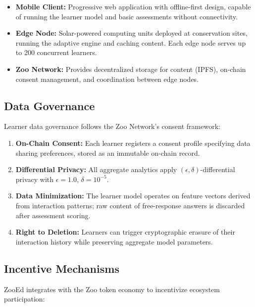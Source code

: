 \documentclass[11pt,a4paper]{article}
\begin{document}
\begin{itemize}[leftmargin=*]
    \item \textbf{Mobile Client:} Progressive web application with offline-first design, capable of running the learner model and basic assessments without connectivity.
    \item \textbf{Edge Node:} Solar-powered computing units deployed at conservation sites, running the adaptive engine and caching content. Each edge node serves up to 200 concurrent learners.
    \item \textbf{Zoo Network:} Provides decentralized storage for content (IPFS), on-chain consent management, and coordination between edge nodes.
\end{itemize}

\subsection{Data Governance}

Learner data governance follows the Zoo Network's consent framework:

\begin{enumerate}[leftmargin=*]
    \item \textbf{On-Chain Consent:} Each learner registers a consent profile specifying data sharing preferences, stored as an immutable on-chain record.
    \item \textbf{Differential Privacy:} All aggregate analytics apply $(\epsilon, \delta)$-differential privacy with $\epsilon = 1.0$, $\delta = 10^{-5}$.
    \item \textbf{Data Minimization:} The learner model operates on feature vectors derived from interaction patterns; raw content of free-response answers is discarded after assessment scoring.
    \item \textbf{Right to Deletion:} Learners can trigger cryptographic erasure of their interaction history while preserving aggregate model parameters.
\end{enumerate}

\subsection{Incentive Mechanisms}

ZooEd integrates with the Zoo token economy to incentivize ecosystem participation:
\end{document}
